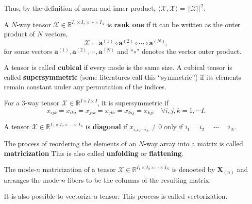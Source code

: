 \documentclass[final]{elsarticle}
\begin{document}
Thus, by the definition of norm and inner product,
$\langle\boldsymbol{\mathscr{X}},\boldsymbol{\mathscr{X}}\rangle=||\boldsymbol{\mathscr{X}}||^2$.
\begin{defn}
    A $N$-way tensor $\boldsymbol{\mathscr{X}}\in\mathbb{R}^{I_1\times I_2\times\cdots\times I_N}$ is \textbf{rank one} if it can
    be written as the outer product of $N$ vectors,
    \begin{equation}
        \boldsymbol{\mathscr{X}} = \mathbf{a}^{(1)}\circ\mathbf{a}^{(2)}\circ\cdots\circ\mathbf{a}^{(N)},
    \end{equation}
    for some vectors $\mathbf{a}^{(1)},\mathbf{a}^{(2)},\cdots,\mathbf{a}^{(N)}$ and ``$\circ$'' denotes the vector outer product.
\end{defn}
\begin{defn}
    A tensor is called \textbf{cubical} if every mode is the same size. A cubical tensor is called \textbf{supersymmetric}
    (some literatures call this ``symmetric'') if its elements remain constant under any permutation of the indices.
\end{defn}
For a $3$-way tensor $\boldsymbol{\mathscr{X}}\in\mathbb{R}^{I\times I\times I}$, it is supersymmetric if
\[
    x_{ijk} = x_{ikj} = x_{jik} = x_{jki} = x_{kij} = x_{kji} \quad \forall i,j,k=1,\cdots I.
\]
\begin{defn}
    A tensor $\boldsymbol{\mathscr{X}}\in\mathbb{R}^{I_1\times I_2\times\cdots\times I_N}$ is \textbf{diagonal}
    if $x_{i_1i_2\cdots i_N}\neq 0$ only if $i_1=i_2=\cdots=i_N$. 
\end{defn}
\begin{defn}[Matricization]
    The process of reordering the elements of an $N$-way array into a matrix is called \textbf{matricization}
This is also called \textbf{unfolding} or \textbf{flattening}.
\end{defn}
The mode-$n$ matricization of a tensor $\boldsymbol{\mathscr{X}}\in\mathbb{R}^{I_1\times I_2\times\cdots\times I_N}$
is denoeted by $\mathbf{X}_{(n)}$ and arranges the mode-$n$ fibers to be the columns of the resulting matrix.
\begin{rmk}
    It is also possible to vectorize a tensor. This process is called vectorization.
\end{rmk}
\end{document}
